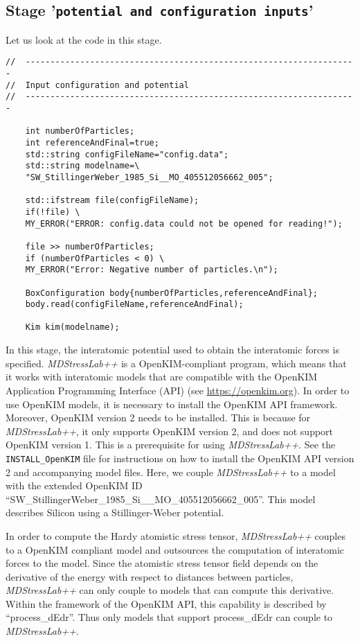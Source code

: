\documentclass[authoryear]{elsarticle}
\newcommand{\ttt}{\texttt}
\newcommand{\MDStressLab}{\emph{MDStressLab++}\xspace}
\begin{document}
\subsection{Stage \textnormal{'\ttt{potential and configuration inputs}'}}
\label{sec:stage:potential and configuration inputs}
Let us look at the code in this stage.
\begin{Verbatim}[frame=single]
//	-------------------------------------------------------------------
//	Input configuration and potential
//	-------------------------------------------------------------------

	int numberOfParticles;
	int referenceAndFinal=true;
	std::string configFileName="config.data";
	std::string modelname=\
	"SW_StillingerWeber_1985_Si__MO_405512056662_005";

	std::ifstream file(configFileName);
	if(!file) \
	MY_ERROR("ERROR: config.data could not be opened for reading!");
	
	file >> numberOfParticles;
	if (numberOfParticles < 0) \
	MY_ERROR("Error: Negative number of particles.\n");

	BoxConfiguration body{numberOfParticles,referenceAndFinal};
	body.read(configFileName,referenceAndFinal);

	Kim kim(modelname);
\end{Verbatim}
In this stage, the interatomic potential used to obtain the interatomic forces
is specified. \MDStressLab is a OpenKIM-compliant program,
which means that it works with interatomic models that
are compatible with the OpenKIM Application Programming
Interface (API) (see \url{https://openkim.org}).
In order to use OpenKIM models, it is necessary to install
the OpenKIM API framework. Moreover, OpenKIM version 2 needs to be installed.
This is because for \MDStressLab, it only supports OpenKIM version 2, and does not support OpenKIM version 1.
 This is a prerequisite for using
\MDStressLab.
See the \ttt{INSTALL\_OpenKIM} file for instructions
on how to install the OpenKIM API version 2 and accompanying model files.
Here, we couple \MDStressLab
to a model with the extended OpenKIM ID
``SW\_StillingerWeber\_1985\_Si\_\_MO\_405512056662\_005''.
This model \citep{MO_405512056662_005} describes Silicon
using a Stillinger-Weber potential.

In order to compute the Hardy
atomistic stress tensor, \MDStressLab couples to a OpenKIM compliant model and
outsources the computation of interatomic
forces to the model.
Since the atomistic stress tensor field depends on the derivative of
        the energy with respect to distances between particles, \MDStressLab can
        only couple to models that can compute this derivative. Within the framework
        of the OpenKIM API, this capability is described by ``process\_dEdr''. Thus
        only models that support process\_dEdr can couple to \MDStressLab.
\end{document}

